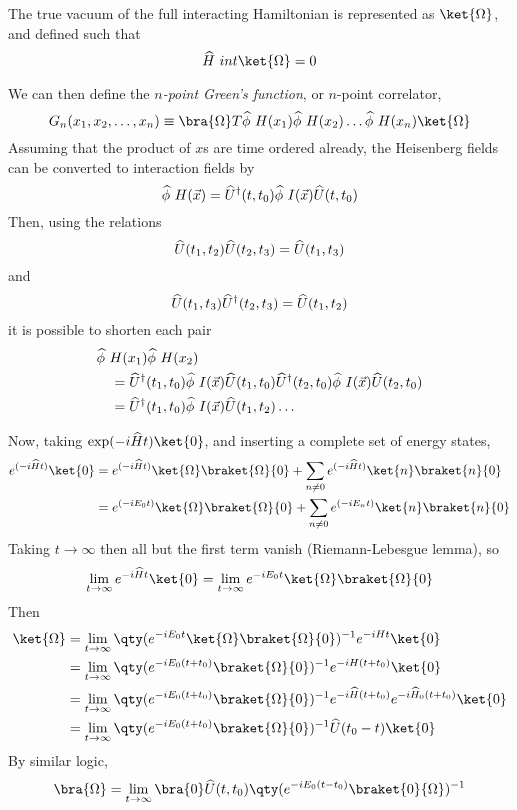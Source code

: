 The true vacuum of the full interacting Hamiltonian is represented as
$\ket{\Omega}$, and defined such that
\begin{equation}
  \label{eq:71}
  \Op{H}~{int} \ket{\Omega} = 0
\end{equation}

We can then define the \emph{$n$-point Green's function}, or $n$-point
correlator,
\begin{equation}
  \label{eq:74}
  G_n(x_1, x_2, \dots, x_n) \equiv \bra{\Omega} T \Op{\phi}~H(x_1) \Op{\phi}~H(x_2) \dots \Op{\phi}~H(x_n) \ket{\Omega}
\end{equation}
Assuming that the product of $x$s are time ordered already, the
Heisenberg fields can be converted to interaction fields by
\begin{equation}
  \label{eq:75}
  {\widehat{\phi}}~H(\vec{x}) = {\widehat{U}}^{\dagger}(t,t_0) {\widehat{\phi}}~I(\vec{x}) {\widehat{U}}(t,t_0)
\end{equation}
Then, using the relations
\[ {\widehat{U}}(t_1,t_2) {\widehat{U}}(t_2,t_3) = {\widehat{U}}(t_1, t_3) \]
and
\[ {\widehat{U}}(t_1,t_3) {\widehat{U}}^{\dagger}(t_2, t_3) = {\widehat{U}}(t_1, t_2) \]
it is possible to shorten each pair
\[ \begin{split}
&{\widehat{\phi}}~H(x_1) {\widehat{\phi}}~H(x_2) \\&\quad= 
{\widehat{U}}^{\dagger}(t_1,t_0) {\widehat{\phi}}~I(\vec{x}) {\widehat{U}}(t_1,t_0) 
{\widehat{U}}^{\dagger}(t_2,t_0) {\widehat{\phi}}~I(\vec{x}) {\widehat{U}}(t_2,t_0)
\\ &\quad=
{\widehat{U}}^{\dagger}(t_1,t_0) {\widehat{\phi}}~I(\vec{x}) {\widehat{U}}(t_1,t_2) \dots
\end{split}
\]

Now, taking $\exp(-i \Op{H} t) \ket{0}$, and inserting a complete set of energy states,
\begin{equation}
  \label{eq:76}
  \begin{split}
    e^{(-i \Op{H} t )} \ket{0} &= e^{(-i \Op{H} t)} \ket{\Omega} \braket{\Omega}{0}+ \sum_{n \neq 0}  e^{(-i \Op{H} t)} \ket{n} \braket{n}{0}\\
&=  e^{(-i E_0 t)} \ket{\Omega} \braket{\Omega}{0}+ \sum_{n \neq 0}  e^{(-i E_n t)} \ket{n} \braket{n}{0}
  \end{split}
\end{equation}
Taking $t \to \infty$ then all but the first term vanish
(Riemann-Lebesgue lemma), so
\[ \lim_{t \to \infty} e^{-i \Op{H} t} \ket{0} = \lim_{t \to \infty} e^{-i E_0 t} \ket{\Omega} \braket{\Omega}{0} \]
Then
\begin{align*}
  \ket{\Omega} &= \lim_{t \to \infty} \qty( e^{-i E_0 t} \ket{\Omega}
  \braket{\Omega}{0})^{-1} e^{-i H t} \ket{0} \\
&=  \lim_{t \to \infty} \qty( e^{-i E_0 (t+t_0)} \braket{\Omega}{0} )^{-1} e^{-i H(t+t_0)}\ket{0} \\
&=  \lim_{t \to \infty} \qty( e^{-i E_0 (t+t_0)} \braket{\Omega}{0} )^{-1} e^{-i \Op{H}(t+t_0)} e^{-i \Op{H}_0(t+t_0)}\ket{0} \\
&=  \lim_{t \to \infty} \qty( e^{-i E_0 (t+t_0)} \braket{\Omega}{0} )^{-1} \Op{U}(t_0-t) \ket{0}
\end{align*}
By similar logic,
\begin{equation*}
  \bra{\Omega} = \lim_{t \to \infty} \bra{0} \Op{U}(t,t_0) \qty( e^{-i E_0(t-t_0)} \braket{0}{\Omega} )^{-1}
\end{equation*}

